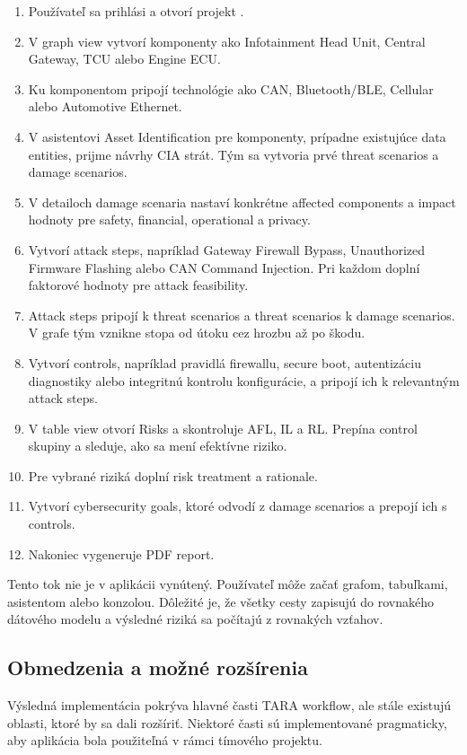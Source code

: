 \documentclass[11pt]{article}
\begin{document}
\begin{enumerate}
    \item Používateľ sa prihlási a otvorí projekt .
    \item V graph view vytvorí komponenty ako Infotainment Head Unit, Central Gateway, TCU alebo Engine ECU.
    \item Ku komponentom pripojí technológie ako CAN, Bluetooth/BLE, Cellular alebo Automotive Ethernet.
    \item V asistentovi Asset Identification pre komponenty, prípadne existujúce data entities, prijme návrhy CIA strát. Tým sa vytvoria prvé threat scenarios a damage scenarios.
    \item V detailoch damage scenaria nastaví konkrétne affected components a impact hodnoty pre safety, financial, operational a privacy.
    \item Vytvorí attack steps, napríklad Gateway Firewall Bypass, Unauthorized Firmware Flashing alebo CAN Command Injection. Pri každom doplní faktorové hodnoty pre attack feasibility.
    \item Attack steps pripojí k threat scenarios a threat scenarios k damage scenarios. V grafe tým vznikne stopa od útoku cez hrozbu až po škodu.
    \item Vytvorí controls, napríklad pravidlá firewallu, secure boot, autentizáciu diagnostiky alebo integritnú kontrolu konfigurácie, a pripojí ich k relevantným attack steps.
    \item V table view otvorí Risks a skontroluje AFL, IL a RL. Prepína control skupiny a sleduje, ako sa mení efektívne riziko.
    \item Pre vybrané riziká doplní risk treatment a rationale.
    \item Vytvorí cybersecurity goals, ktoré odvodí z damage scenarios a prepojí ich s controls.
    \item Nakoniec vygeneruje PDF report.
\end{enumerate}

Tento tok nie je v aplikácii vynútený. Používateľ môže začať grafom, tabuľkami, asistentom alebo konzolou. Dôležité je, že všetky cesty zapisujú do rovnakého dátového modelu a výsledné riziká sa počítajú z rovnakých vzťahov.

\subsection{Obmedzenia a možné rozšírenia}

Výsledná implementácia pokrýva hlavné časti TARA workflow, ale stále existujú oblasti, ktoré by sa dali rozšíriť. Niektoré časti sú implementované pragmaticky, aby aplikácia bola použiteľná v rámci tímového projektu.
\end{document}
